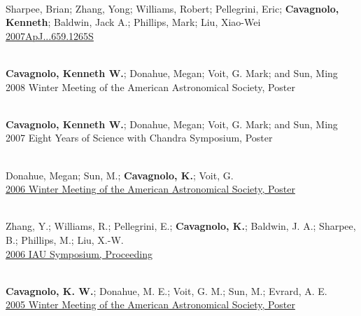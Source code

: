 \documentclass[11pt]{cv}
\begin{document}
\begin{llist}
{}\\
Sharpee, Brian; Zhang, Yong; Williams, Robert; Pellegrini, Eric; {\bf Cavagnolo, Kenneth}; Baldwin, Jack A.; Phillips, Mark; Liu, Xiao-Wei\\
\href{http://adsabs.harvard.edu/abs/2007ApJ...659.1265S}{2007ApJ...659.1265S}



{}\\
{\bf Cavagnolo, Kenneth W.}; Donahue, Megan; Voit, G. Mark; and Sun, Ming\\
2008 Winter Meeting of the American Astronomical Society, Poster

{}\\
{\bf Cavagnolo, Kenneth W.}; Donahue, Megan; Voit, G. Mark; and Sun, Ming\\
2007 Eight Years of Science with Chandra Symposium, Poster

{}\\
Donahue, Megan; Sun, M.; {\bf Cavagnolo, K.}; Voit, G.\\
\href{http://adsabs.harvard.edu/abs/2006AAS...209.7711D}{2006 Winter
Meeting of the American Astronomical Society, Poster}

{}\\
Zhang, Y.; Williams, R.; Pellegrini, E.; {\bf Cavagnolo, K.}; Baldwin,
J. A.; Sharpee, B.; Phillips, M.; Liu, X.-W.\\
\href{http://adsabs.harvard.edu/abs/2006IAUS..234..549Z}{2006 IAU
Symposium, Proceeding}

{}\\
{\bf Cavagnolo, K. W.}; Donahue, M. E.; Voit, G. M.; Sun, M.; Evrard, A. E.\\
\href{http://adsabs.harvard.edu/abs/2005AAS...20713903C}{2005 Winter
Meeting of the American Astronomical Society, Poster}


\end{llist}
\end{document}

